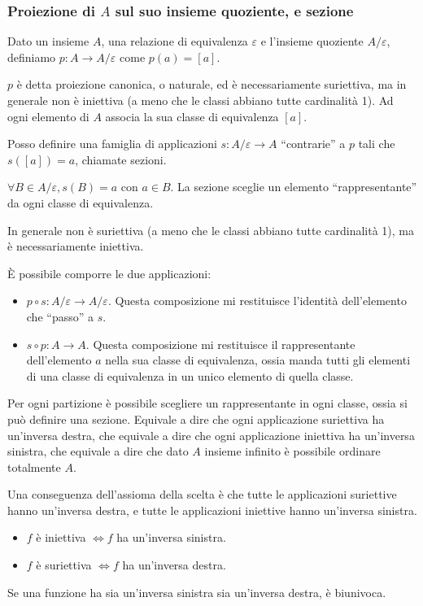 \subsubsection{Proiezione di $A$ sul suo insieme quoziente, e sezione}

\begin{defn}[Proiezione]
Dato un insieme $A$, una relazione di equivalenza $\varepsilon$ e l'insieme quoziente $A / \varepsilon$, definiamo $p : A \to A / \varepsilon $ come $ p(a) = [a]$.
\end{defn}
$p$ \`e detta proiezione canonica, o naturale, ed \`e necessariamente suriettiva, ma in generale non \`e iniettiva (a meno che le classi abbiano tutte cardinalit\`a 1). Ad ogni elemento di $A$ associa la sua classe di equivalenza $[a]$.

Posso definire una famiglia di applicazioni $s : A / \varepsilon \to A $ ``contrarie'' a $p$ tali che $s([a]) = a$, chiamate sezioni.
\begin{defn}[Sezione]
$\forall B \in A / \varepsilon , s(B) = a$ con $a \in B$. La sezione sceglie un elemento ``rappresentante'' da ogni classe di equivalenza. 
\end{defn}
In generale non \`e suriettiva (a meno che le classi abbiano tutte cardinalit\`a 1), ma \`e necessariamente iniettiva.

\`E possibile comporre le due applicazioni:
\begin{itemize}
  \item $p \circ s: A / \varepsilon \to A / \varepsilon$. Questa composizione mi restituisce l'identit\`a dell'elemento che ``passo'' a $s$.
  \item $s \circ p : A \to A$. Questa composizione mi restituisce il rappresentante dell'elemento $a$ nella sua classe di equivalenza, ossia manda tutti gli elementi di una classe di equivalenza in un unico elemento di quella classe.
\end{itemize}

\begin{theorem}
Per ogni partizione \`e possibile scegliere un rappresentante in ogni classe, ossia si pu\`o definire una sezione. Equivale a dire che ogni applicazione suriettiva ha un'inversa destra, che equivale a dire che ogni applicazione iniettiva ha un'inversa sinistra, che equivale a dire che dato $A$ insieme infinito \`e possibile ordinare totalmente $A$.
\end{theorem}

Una conseguenza dell'assioma della scelta \`e che tutte le applicazioni suriettive hanno un'inversa destra, e tutte le applicazioni iniettive hanno un'inversa sinistra.
\begin{itemize}
  \item $f$ \`e iniettiva $\iff f$ ha un'inversa sinistra.
  \item $f$ \`e suriettiva $\iff f$ ha un'inversa destra.
\end{itemize}
Se una funzione ha sia un'inversa sinistra sia un'inversa destra, \`e biunivoca.

